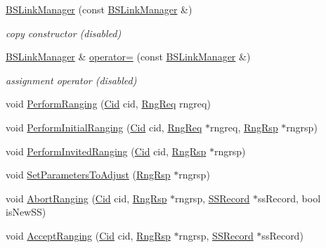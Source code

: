 \begin{DoxyCompactItemize}
\item 
\hyperlink{classns3_1_1BSLinkManager_a680316c25c58d027b3a4bb6f19593b1c}{B\+S\+Link\+Manager} (const \hyperlink{classns3_1_1BSLinkManager}{B\+S\+Link\+Manager} \&)
\begin{DoxyCompactList}\small\item\em copy constructor (disabled) \end{DoxyCompactList}\item 
\hyperlink{classns3_1_1BSLinkManager}{B\+S\+Link\+Manager} \& \hyperlink{classns3_1_1BSLinkManager_aa626bf5372ae952fa1206214c5201442}{operator=} (const \hyperlink{classns3_1_1BSLinkManager}{B\+S\+Link\+Manager} \&)
\begin{DoxyCompactList}\small\item\em assignment operator (disabled) \end{DoxyCompactList}\item 
void \hyperlink{classns3_1_1BSLinkManager_ae23a1b4507b6fc812727c1ab064c95ae}{Perform\+Ranging} (\hyperlink{classns3_1_1Cid}{Cid} cid, \hyperlink{classns3_1_1RngReq}{Rng\+Req} rngreq)
\item 
void \hyperlink{classns3_1_1BSLinkManager_a8c97286c0b9d58f6b175e7f4e82ccd36}{Perform\+Initial\+Ranging} (\hyperlink{classns3_1_1Cid}{Cid} cid, \hyperlink{classns3_1_1RngReq}{Rng\+Req} $\ast$rngreq, \hyperlink{classns3_1_1RngRsp}{Rng\+Rsp} $\ast$rngrsp)
\item 
void \hyperlink{classns3_1_1BSLinkManager_a094fa709f5eaa532b959808967b65464}{Perform\+Invited\+Ranging} (\hyperlink{classns3_1_1Cid}{Cid} cid, \hyperlink{classns3_1_1RngRsp}{Rng\+Rsp} $\ast$rngrsp)
\item 
void \hyperlink{classns3_1_1BSLinkManager_aaf3edf52fbc826d504c521f5303f309f}{Set\+Parameters\+To\+Adjust} (\hyperlink{classns3_1_1RngRsp}{Rng\+Rsp} $\ast$rngrsp)
\item 
void \hyperlink{classns3_1_1BSLinkManager_a4ff9f6b3fd2578e415c83f604ab88b4e}{Abort\+Ranging} (\hyperlink{classns3_1_1Cid}{Cid} cid, \hyperlink{classns3_1_1RngRsp}{Rng\+Rsp} $\ast$rngrsp, \hyperlink{classns3_1_1SSRecord}{S\+S\+Record} $\ast$ss\+Record, bool is\+New\+SS)
\item 
void \hyperlink{classns3_1_1BSLinkManager_abeb3786d298e966245b505f706c6c98a}{Accept\+Ranging} (\hyperlink{classns3_1_1Cid}{Cid} cid, \hyperlink{classns3_1_1RngRsp}{Rng\+Rsp} $\ast$rngrsp, \hyperlink{classns3_1_1SSRecord}{S\+S\+Record} $\ast$ss\+Record)
\item 

\end{DoxyCompactItemize}
